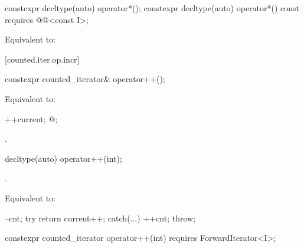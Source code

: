 \begin{addedblock}
%
%
\begin{itemdecl}
constexpr decltype(auto) operator*();
constexpr decltype(auto) operator*() const
  requires @@<const I>;
\end{itemdecl}

\begin{itemdescr}
\pnum
\effects Equivalent to:
\end{itemdescr}

[counted.iter.op.incr]{}

%
%
\begin{itemdecl}
constexpr counted_iterator& operator++();
\end{itemdecl}

\begin{itemdescr}
\pnum
\oldtxt{\requires} \newtxt{\expects}

\pnum
\effects Equivalent to:
\begin{codeblock}
++current;
@\dcr@cnt;
\end{codeblock}

\pnum
\returns {}.
\end{itemdescr}

%
%
\begin{itemdecl}
decltype(auto) operator++(int);
\end{itemdecl}

\begin{itemdescr}
\pnum
\oldtxt{\requires} \newtxt{\expects}
.

\pnum
\effects Equivalent to:
\begin{codeblock}
--cnt;
try { return current++; }
catch(...) { ++cnt; throw; }
\end{codeblock}
\end{itemdescr}

\begin{itemdecl}
constexpr counted_iterator operator++(int)
  requires ForwardIterator<I>;
\end{itemdecl}

\begin{itemdescr}
\pnum
\oldtxt{\requires} \newtxt{\expects}


\end{itemdescr}
\end{addedblock}
